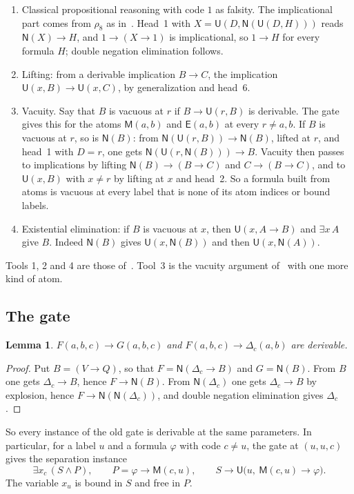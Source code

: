 \documentclass[11pt,letterpaper]{article}
\newtheorem{lemma}[theorem]{Lemma}
\newcommand{\Mc}{\mathsf{M}}
\newcommand{\Uc}{\mathsf{U}}
\newcommand{\Ec}{\mathsf{E}}
\newcommand{\Nc}{\mathsf{N}}
\begin{document}
\begin{enumerate}
\item Classical propositional reasoning with code $1$ as falsity. The
  implicational part comes from $\rho_8$ as in~\cite{pa209}. Head~1
  with $X=\Uc(D,\Nc(\Uc(D,H)))$ reads $\Nc(X)\to H$, and
  $1\to(X\to1)$ is implicational, so $1\to H$ for every formula $H$;
  double negation elimination follows.
\item Lifting: from a derivable implication $B\to C$, the implication
  $\Uc(x,B)\to\Uc(x,C)$, by generalization and head~6.
\item Vacuity. Say that $B$ is vacuous at $r$ if $B\to\Uc(r,B)$ is
  derivable. The gate gives this for the atoms $\Mc(a,b)$ and
  $\Ec(a,b)$ at every $r\ne a,b$. If $B$ is vacuous at $r$, so is
  $\Nc(B)$: from $\Nc(\Uc(r,B))\to\Nc(B)$, lifted at $r$, and head~1
  with $D=r$, one gets $\Nc(\Uc(r,\Nc(B)))\to B$. Vacuity then passes
  to implications by lifting $\Nc(B)\to(B\to C)$ and $C\to(B\to C)$,
  and to $\Uc(x,B)$ with $x\ne r$ by lifting at $x$ and head~2. So a
  formula built from atoms is vacuous at every label that is none of
  its atom indices or bound labels.
\item Existential elimination: if $B$ is vacuous at $x$, then
  $\Uc(x,A\to B)$ and $\exists x\,A$ give $B$. Indeed $\Nc(B)$ gives
  $\Uc(x,\Nc(B))$ and then $\Uc(x,\Nc(A))$.
\end{enumerate}
Tools 1, 2 and 4 are those of~\cite{pa209}. Tool~3 is the vacuity
argument of~\cite{pa209} with one more kind of atom.

\subsection{The gate}

\begin{lemma}\label{lem:extract}
$F(a,b,c)\to G(a,b,c)$ and $F(a,b,c)\to\Delta_c(a,b)$ are derivable.
\end{lemma}

\begin{proof}
Put $B=(V\to Q)$, so that $F=\Nc(\Delta_c\to B)$ and $G=\Nc(B)$. From
$B$ one gets $\Delta_c\to B$, hence $F\to\Nc(B)$. From $\Nc(\Delta_c)$
one gets $\Delta_c\to B$ by explosion, hence
$F\to\Nc(\Nc(\Delta_c))$, and double negation elimination gives
$\Delta_c$.
\end{proof}

So every instance of the old gate is derivable at the same parameters.
In particular, for a label $u$ and a formula $\varphi$ with code
$c\ne u$, the gate at $(u,u,c)$ gives the separation instance
\begin{equation}\label{eq:sep}
 \exists x_c\,(S\wedge P),\qquad
 P=\varphi\to\Mc(c,u),\qquad
 S\to\Uc\bigl(u,\ \Mc(c,u)\to\varphi\bigr).
\end{equation}
The variable $x_u$ is bound in $S$ and free in $P$.
\end{document}
